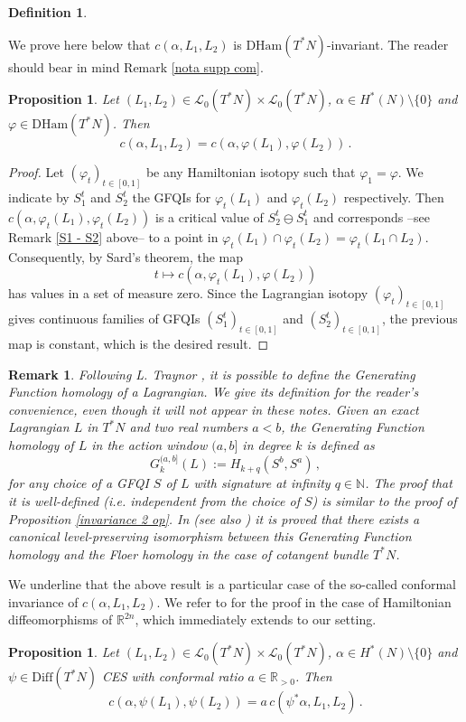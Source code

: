 \documentclass{article}
\newcommand{\1}{\mathbbm{1}}
\newcommand{\numberset}{\mathbb}
\newcommand{\N}{\numberset{N}}
\newcommand{\R}{\numberset{R}}
\newtheorem{prp}[thm]{Proposition}
\newtheorem{defn}[thm]{Definition}
\newtheorem{rem}[thm]{Remark}
\theoremstyle{remark}
\begin{document}
{{\begin{defn}
\end{defn}
\noindent We prove here below that $c(\alpha, L_1,L_2)$ is $\mathrm{DHam}(T^*N)$-invariant. The reader should bear in mind Remark \ref{nota supp com}.
\begin{prp} \label{invariance phi} Let $(L_1,L_2) \in \mathscr{L}_0(T^*N) \times \mathscr{L}_0(T^*N)$, $\alpha\in H^*(N) \setminus \{0\}$ and $\varphi \in \mathrm{DHam}(T^*N)$. Then
$$c(\alpha,L_1,L_2) = c(\alpha,\varphi(L_1),\varphi(L_2))\, .$$
\end{prp}
\begin{proof}
Let $(\varphi_t)_{t\in[0,1]}$ be any Hamiltonian isotopy such that $\varphi_1 = \varphi$. We indicate by $S_1^t$ and $S_2^t$ the GFQIs for $\varphi_t(L_1)$ and $\varphi_t(L_2)$ respectively. Then $c(\alpha,\varphi_t(L_1),\varphi_t(L_2))$ is a critical value of $S^t_2 \ominus S^t_1$ and corresponds --see Remark \ref{S1 - S2} above-- to a point in $\varphi_t(L_1) \cap \varphi_t(L_2) = \varphi_t(L_1 \cap L_2)$. Consequently, by Sard's theorem, the map
$$t \mapsto c(\alpha, \varphi_t(L_1),\varphi(L_2))$$
has values in a set of measure zero. Since the Lagrangian isotopy $(\varphi_t)_{t \in [0,1]}$ gives continuous families of GFQIs $(S_1^t)_{t \in [0,1]}$ and $(S_2^t)_{t \in [0,1]}$, the previous map is constant, which is the desired result. 
\end{proof}
\begin{rem}\label{rem:milOh}
\textnormal{Following L. Traynor \cite{Tray}, it is possible to define the Generating Function homology of a Lagrangian. We give its definition for the reader's convenience, even though it will not  appear in these notes. Given an exact Lagrangian $L$ in $T^*N$ and two real numbers $a<b$, the Generating Function homology of $L$ in the action window $(a, b]$ in degree $k$ is defined as
\begin{equation*}
    G^{(a, b]}_k(L):=H_{k+q}(S^b, S^a)\, ,
\end{equation*} for any choice of a GFQI $S$ of $L$ with signature at infinity $q\in\N$. The proof that it is well-defined (i.e. independent from the choice of $S$) is similar to the proof of Proposition \ref{invariance 2 op}. In \cite{Viterbo1995b} (see also \cite{milOh97}) it is proved that there exists a canonical level-preserving isomorphism between this Generating Function homology and the Floer homology in the case of cotangent bundle $T^*N$.}
\end{rem}

\noindent We underline that the above result is a particular case of the so-called conformal invariance of $c(\alpha, L_1,L_2)$. We refer to \cite[Corollary 4.3]{vit92} for the proof in the case of Hamiltonian diffeomorphisms of $\R^{2n}$, which immediately extends to our setting. 
\begin{prp} \label{conformal invariance phi} Let $(L_1,L_2) \in \mathscr{L}_0(T^*N) \times \mathscr{L}_0(T^*N)$, $\alpha\in H^*(N) \setminus \{0\}$ and $\psi \in \mathrm{Diff}(T^*N)$ CES with conformal ratio $a \in \mathbb{R}_{> 0}$. Then
$$c(\alpha,\psi(L_1),\psi(L_2)) = a\,c(\psi^* \alpha,L_1,L_2)\, .$$ 
\end{prp}

}}
\end{document}
